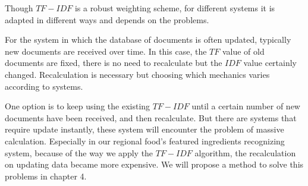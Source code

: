 Though $TF-IDF$ is a robust weighting scheme, for different systems it is adapted in different ways and depends on the problems. 

For the system in which the database of documents is often updated, typically new documents are received over time. In this case, the $TF$ value of old documents are fixed, there is no need to recalculate but the $IDF$ value certainly changed. Recalculation is necessary but choosing which mechanics varies according to systems.

One option is to keep using the existing $TF-IDF$ until a certain number of new documents have been received, and then recalculate. But there are systems that require update instantly, these system will encounter the problem of massive calculation. Especially in our regional food's featured ingredients recognizing system, because of the way we apply the $TF-IDF$ algorithm, the recalculation on updating data became more expensive. We will propose a method to solve this problems in chapter 4.     

